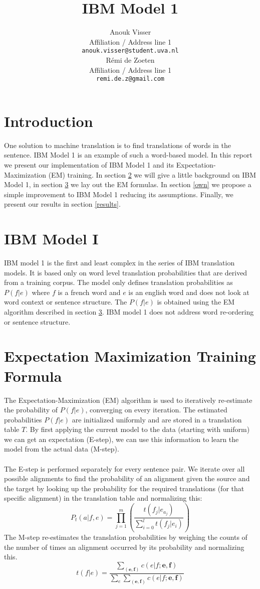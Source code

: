 \documentclass[11pt]{article}
\title{IBM Model 1}
\author{Anouk Visser \\
  Affiliation / Address line 1 \\
  {\tt anouk.visser@student.uva.nl} \\\And
  R\'emi de Zoeten \\
  Affiliation / Address line 1 \\
  {\tt remi.de.z@gmail.com} \\}
\date{}
\begin{document}
\maketitle

\section{Introduction}
One solution to machine translation is to find translations of words in the sentence. IBM Model 1 is an example of such a word-based model. In this report we present our implementation of IBM Model 1 and its Expectation-Maximization (EM) training. In section \ref{IBM} we will give a little background on IBM Model 1, in section \ref{em} we lay out the EM formulas. In section \ref{own} we propose a simple improvement to IBM Model 1 reducing its assumptions. Finally, we present our results in section \ref{results}.


\section{IBM Model I}
\label{IBM}
IBM model 1 is the first and least complex in the series of IBM translation models. It is based only on word level translation probabilities that are derived from a training corpus. The model only defines translation probabilities as $P(f|e)$ where $f$ is a french word and $e$ is an english word and does not look at word context or sentence structure. The $P(f|e)$ is obtained using the EM algorithm described in section \ref{em}. IBM model 1 does not address word re-ordering or sentence structure.

\section{Expectation Maximization Training Formula}
\label{em}
The Expectation-Maximization (EM) algorithm is used to iteratively re-estimate the probability of $P(f|e)$, converging on every iteration. The estimated probabilities $P(f|e)$ are initialized uniformly and are stored in a translation table $T$. By first applying the current model to the data (starting with uniform) we can get an expectation (E-step), we can use this information to learn the model from the actual data (M-step).\\\\
The E-step is performed separately for every sentence pair. We iterate over all possible alignments to find the probability of an alignment given the source and the target by looking up the probability for the required translations (for that specific alignment) in the translation table and normalizing this: 
$$P_t(a|f, e) = \prod\limits_{j=1}^{m} (\frac{t(f_j|e_{a_{j}})}{\sum\limits_{i=0}^{l}t(f_j|e_i)})$$
The M-step re-estimates the translation probabilities by weighing the counts of the number of times an alignment occurred by its probability and normalizing this. 
$$t(f|e) = \frac{\sum\limits_{(\textbf{e}, \textbf{f})} c(e|f; \textbf{e}, \textbf{f})}{\sum\limits_{e}\sum\limits_{(\textbf{e}, \textbf{f})} c(e|f; \textbf{e}, \textbf{f})}$$
\end{document}
